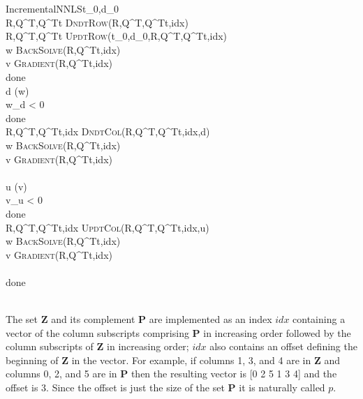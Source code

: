\begin{pseudocode}{IncrementalNNLS}{t_0,d_0}
                              \\
R,Q^T,Q^Tt \GETS \textsc{DndtRow}(R,Q^T,Q^Tt,idx)           \\
R,Q^T,Q^Tt \GETS \textsc{UpdtRow}(t_0,d_0,R,Q^T,Q^Tt,idx)     \\
w \GETS \textsc{BackSolve}(R,Q^Tt,idx)                          \\
v \GETS \textsc{Gradient}(R,Q^Tt,idx)                    \\
\REPEAT
  done \GETS \TRUE                                              \\
  d \GETS \arg\min(w)                                          \\
  \IF w_d < 0 \THEN                                            \\
  \BEGIN
    done \GETS \FALSE                                         \\
    R,Q^T,Q^Tt,idx \GETS \textsc{DndtCol}(R,Q^T,Q^Tt,idx,d)   \\
    w \GETS \textsc{BackSolve}(R,Q^Tt,idx)                    \\
    v \GETS \textsc{Gradient}(R,Q^Tt,idx)              \\
  \END                                                        \\
  u \GETS \arg\min(v)                                         \\
  \IF v_u < 0 \THEN                                           \\
  \BEGIN
    done \GETS \FALSE                                         \\
    R,Q^T,Q^Tt,idx \GETS \textsc{UpdtCol}(R,Q^T,Q^Tt,idx,u)     \\
    w \GETS \textsc{BackSolve}(R,Q^Tt,idx)                    \\
    v \GETS \textsc{Gradient}(R,Q^Tt,idx)              \\
  \END                                                        \\
\UNTIL done                                                   \\
                                                  \\
\end{pseudocode}

The set \textbf{Z} and its complement \textbf{P} are implemented as an index $idx$
containing a vector of the column subscripts comprising \textbf{P} in increasing order
followed by the column subscripts of \textbf{Z} in increasing order;
$idx$ also contains an offset defining the beginning of \textbf{Z} in the vector.
For example, if columns 1, 3, and 4 are in \textbf{Z} and columns 0, 2, and 5 are in \textbf{P}
then the resulting vector is [0 2 5 1 3 4] and the offset is 3.
Since the offset is just the size of the set \textbf{P} it is naturally called $p$.

